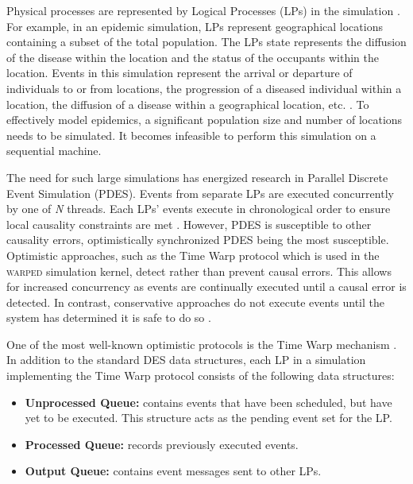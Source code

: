 \documentclass[11pt]{book}
\begin{document}
Physical processes are represented by Logical Processes (LPs) in the simulation
\cite{des_misra}.  For example, in an epidemic simulation, LPs represent
geographical locations containing a subset of the total population.  The LPs
state represents the diffusion of the disease within the location and the status
of the occupants within the location.  Events in this simulation represent the
arrival or departure of individuals to or from locations, the progression of a
diseased individual within a location, the diffusion of a disease within a
geographical location, etc. \cite{epidemic}. To effectively model epidemics, a
significant population size and number of locations needs to be simulated.  It
becomes infeasible to perform this simulation on a sequential machine.  

The need for such large simulations has energized research in Parallel Discrete Event
Simulation (PDES).  Events from separate LPs are executed concurrently by one of
\emph{N} threads.  Each LPs' events execute in chronological order to ensure local
causality constraints are met \cite{fujimoto}.  However, PDES is susceptible to other
causality errors, optimistically synchronized PDES being the most susceptible.  Optimistic
approaches, such as the Time Warp protocol which is used in the \textsc{warped} simulation kernel,
detect rather than prevent causal errors.  This allows for increased concurrency as events
are continually executed until a causal error is detected.  In contrast, conservative
approaches do not execute events until the system has determined it is safe to do so
\cite{fujimoto}.

One of the most well-known optimistic protocols is the Time Warp mechanism
\cite{fujimoto}.  In addition to the standard DES data structures, each LP in a simulation
implementing the Time Warp protocol consists of the following data structures:

\begin{itemize}
  \item \textbf{Unprocessed Queue:} contains events that have been scheduled, but have yet
    to be executed.  This structure acts as the pending event set for the LP.
  \item\textbf{Processed Queue:} records previously executed events.
  \item\textbf{Output Queue:} contains event messages sent to other LPs.
\end{itemize}
\end{document}
